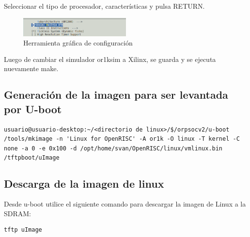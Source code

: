 Seleccionar el tipo de procesador, características y pulsa RETURN. 
\begin{figure}[h!]
 \begin{center}
  \includegraphics[width=0.5\textwidth,keepaspectratio=true]{./images/tipoprocesador}
  \caption{Herramienta gráfica de configuración}
 \end{center}
\end{figure}
  
Luego de cambiar el simulador or1ksim a Xilinx, se guarda y se ejecuta nuevamente make.

\subsection{Generación de la imagen para ser levantada por U-boot}
\begin{lstlisting}[breaklines]
usuario@usuario-desktop:~/<directorio de linux>/$/orpsocv2/u-boot /tools/mkimage -n 'Linux for OpenRISC' -A or1k -O linux -T kernel -C none -a 0 -e 0x100 -d /opt/home/svan/OpenRISC/linux/vmlinux.bin /tftpboot/uImage
\end{lstlisting}

\subsection{Descarga de la imagen de linux}

Desde u-boot utilice el siguiente comando para descargar la imagen de Linux a la SDRAM:

\begin{lstlisting}[breaklines]
tftp uImage
\end{lstlisting}


